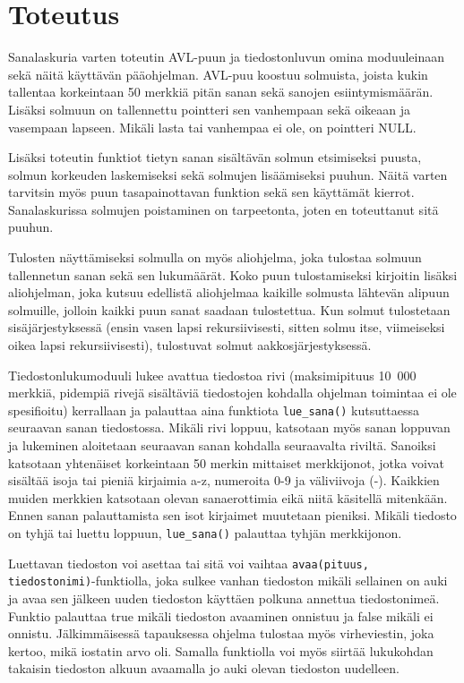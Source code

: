 \documentclass[12pt,a4paper,titlepage]{article}
\begin{document}
\section{Toteutus}
Sanalaskuria varten toteutin AVL-puun ja tiedostonluvun omina moduuleinaan sekä näitä käyttävän pääohjelman. AVL-puu koostuu solmuista, joista kukin tallentaa korkeintaan 50 merkkiä pitän sanan sekä sanojen esiintymismäärän. Lisäksi solmuun on tallennettu pointteri sen vanhempaan sekä oikeaan ja vasempaan lapseen. Mikäli lasta tai vanhempaa ei ole, on pointteri NULL.

Lisäksi toteutin funktiot tietyn sanan sisältävän solmun etsimiseksi puusta, solmun korkeuden laskemiseksi sekä solmujen lisäämiseksi puuhun. Näitä varten tarvitsin myös puun tasapainottavan funktion sekä sen käyttämät kierrot. Sanalaskurissa solmujen poistaminen on tarpeetonta, joten en toteuttanut sitä puuhun.

Tulosten näyttämiseksi solmulla on myös aliohjelma, joka tulostaa solmuun tallennetun sanan sekä sen lukumäärät. Koko puun tulostamiseksi kirjoitin lisäksi aliohjelman, joka kutsuu edellistä aliohjelmaa kaikille solmusta lähtevän alipuun solmuille, jolloin kaikki puun sanat saadaan tulostettua. Kun solmut tulostetaan sisäjärjestyksessä (ensin vasen lapsi rekursiivisesti, sitten solmu itse, viimeiseksi oikea lapsi rekursiivisesti), tulostuvat solmut aakkosjärjestyksessä.

Tiedostonlukumoduuli lukee avattua tiedostoa rivi (maksimipituus 10~000 merkkiä, pidempiä rivejä sisältäviä tiedostojen kohdalla ohjelman toimintaa ei ole spesifioitu) kerrallaan ja palauttaa aina funktiota \texttt{lue\_sana()} kutsuttaessa seuraavan sanan tiedostossa. Mikäli rivi loppuu, katsotaan myös sanan loppuvan ja lukeminen aloitetaan seuraavan sanan kohdalla seuraavalta riviltä. Sanoiksi katsotaan yhtenäiset korkeintaan 50 merkin mittaiset merkkijonot, jotka voivat sisältää isoja tai pieniä kirjaimia a-z, numeroita 0-9 ja väliviivoja (-). Kaikkien muiden merkkien katsotaan olevan sanaerottimia eikä niitä käsitellä mitenkään. Ennen sanan palauttamista sen isot kirjaimet muutetaan pieniksi. Mikäli tiedosto on tyhjä tai luettu loppuun, \texttt{lue\_sana()} palauttaa tyhjän merkkijonon.

Luettavan tiedoston voi asettaa tai sitä voi vaihtaa \texttt{avaa(pituus, tiedostonimi)}-\-funktiolla, joka sulkee vanhan tiedoston mikäli sellainen on auki ja avaa sen jälkeen uuden tiedoston käyttäen polkuna annettua tiedostonimeä. Funktio palauttaa true mikäli tiedoston avaaminen onnistuu ja false mikäli ei onnistu. Jälkimmäisessä tapauksessa ohjelma tulostaa myös virheviestin, joka kertoo, mikä iostatin arvo oli. Samalla funktiolla voi myös siirtää lukukohdan takaisin tiedoston alkuun avaamalla jo auki olevan tiedoston uudelleen.
\end{document}
